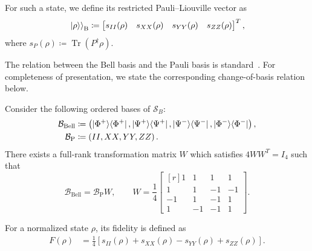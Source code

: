 For such a state, we define its restricted Pauli--Liouville vector as
\begin{equation}
    \left. \left|\rho\right\rangle \right \rangle_{\mathrm B}
    \coloneqq
    \begin{bmatrix}
        s_{II}(\rho)  &
        s_{XX}(\rho)  &
        s_{Y Y}(\rho) &
        s_{Z Z}(\rho)
    \end{bmatrix}^{ T},
    \label{eq:restricted-pauli-liouville-vector}
\end{equation}
where $s_P(\rho)\coloneqq\operatorname{Tr}(P^\dagger\rho)$.

The relation between the Bell basis and the Pauli basis is
standard~\cite{Horodecki1996,Luo2008}. For completeness of presentation, we state the
corresponding change-of-basis relation below.

\begin{lemma}
    \label{lem:bell-pauli-transformation}
    Consider the following ordered bases of \(\mathcal S_B\):
    \begin{equation}
        \begin{aligned}
            \mathcal B_{\mathrm{Bell}}
             & \coloneqq
            \left(
            \ket{\Phi^+}\!\bra{\Phi^+},
            \ket{\Psi^+}\!\bra{\Psi^+},
            \ket{\Psi^-}\!\bra{\Psi^-},
            \ket{\Phi^-}\!\bra{\Phi^-}
            \right),     \\
            \mathcal B_{\mathrm P}
             & \coloneqq
            \left(
            I I,
            X X,
            Y Y,
            Z Z
            \right).
        \end{aligned}
        \label{1}
    \end{equation}
    There exists a full-rank transformation matrix $W$ which satisfies $4WW^T= I_4$ such that
    \begin{equation}
        \mathcal{B}_{\mathrm{Bell}}
        =
        \mathcal{B}_{\mathrm{P}}W,
        \qquad
        W=
        \frac{1}{4}     \begin{bmatrix*}[r]
         1 &  1 &  1 &  1 \\
         1 &  1 & -1 & -1 \\
        -1 &  1 & -1 &  1 \\
         1 & -1 & -1 &  1
    \end{bmatrix*}.
        \label{eq:bell-pauli-transform}
    \end{equation}
\end{lemma}

For a normalized state \(\rho\), its fidelity is defined as
\begin{equation}
    \begin{aligned}
        F(\rho)
         & =\frac{1}{4}\left[
                           s_{I I}(\rho)
                           +s_{X X}(\rho)
                           -s_{Y Y}(\rho)
                           +s_{Z Z}(\rho)
                           \right].
    \end{aligned}
    \label{eq:bell-state-fidelity}
\end{equation}

